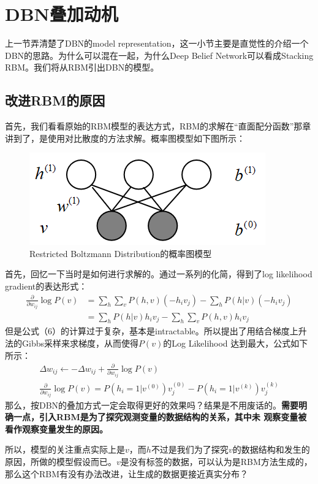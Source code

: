 \documentclass[a4paper]{article}
\begin{document}
\section{DBN叠加动机}
上一节弄清楚了DBN的model representation，这一小节主要是直觉性的介绍一个DBN的思路。为什么可以混在一起，为什么Deep Belief Network可以看成Stacking RBM。我们将从RBM引出DBN的模型。
\subsection{改进RBM的原因}
首先，我们看看原始的RBM模型的表达方式，RBM的求解在“直面配分函数”那章讲到了，是使用对比散度的方法求解。概率图模型如下图所示：
\begin{figure}[H]
    \centering
    \includegraphics[width=.4\textwidth]{微信图片_20200407131510.png}
    \caption{Restricted Boltzmann Distribution的概率图模型}
    \label{fig:my_label_1}
\end{figure}
首先，回忆一下当时是如何进行求解的。通过一系列的化简，得到了log likelihood gradient的表达形式：
\begin{equation}\begin{aligned}
\frac{\partial}{\partial w_{i j}} \log P(v) &=\sum_{h} \sum_{v} P(h, v)\left(-h_{i} v_{j}\right)-\sum_{h} P(h | v)\left(-h_{i} v_{j}\right) \\
&=\sum_{h} P(h | v) h_{i} v_{j}-\sum_{h} \sum_{v} P(h, v) h_{i} v_{j}
\end{aligned}\end{equation}
但是公式（6）的计算过于复杂，基本是intractable。所以提出了用结合梯度上升法的Gibbs采样来求梯度，从而使得$P(v)$的Log Likelihood 达到最大，公式如下所示：
\begin{gather}
\Delta w_{i j} \leftarrow-\Delta w_{i j}+\frac{\partial}{\partial w_{i j}} \log P(v) \\
\frac{\partial}{\partial w_{i j}} \log P(v)=P\left(h_{i}=1 | v^{(0)}\right) v_{j}^{(0)}-P\left(h_{i}=1 | v^{(k)}\right) v_{j}^{(k)}
\end{gather}
那么，按DBN的叠加方式一定会取得更好的效果吗？结果是不用废话的。\textbf{需要明确一点，引入RBM是为了探究观测变量的数据结构的关系，其中未
观察变量被看作观察变量发生的原因。}

所以，模型的关注重点实际上是$v$，而$h$不过是我们为了探究$v$的数据结构和发生的原因，所做的模型假设而已。$v$是没有标签的数据，可以认为是RBM方法生成的，那么这个RBM有没有办法改进，让生成的数据更接近真实分布？
\end{document}
